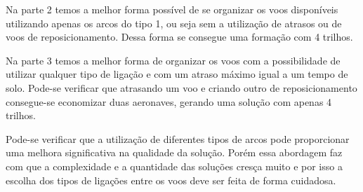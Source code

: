 Na parte 2 temos a melhor forma possível de se organizar os voos disponíveis
utilizando apenas os arcos do tipo 1, ou seja sem a utilização de atrasos ou de
voos de reposicionamento. Dessa forma se consegue uma formação com 4 trilhos.

Na parte 3 temos a melhor forma de organizar os voos com a possibilidade de
utilizar qualquer tipo de ligação e com um atraso máximo igual a um tempo de
solo. Pode-se verificar que atrasando um voo e criando outro de
reposicionamento consegue-se economizar duas aeronaves, gerando uma solução com
apenas 4 trilhos.

Pode-se verificar que a utilização de diferentes tipos de arcos pode
proporcionar uma melhora significativa na qualidade da solução. Porém essa
abordagem faz com que a complexidade e a quantidade das soluções
cresça muito e por isso a escolha dos tipos de ligações entre os voos
deve ser feita de forma cuidadosa.

